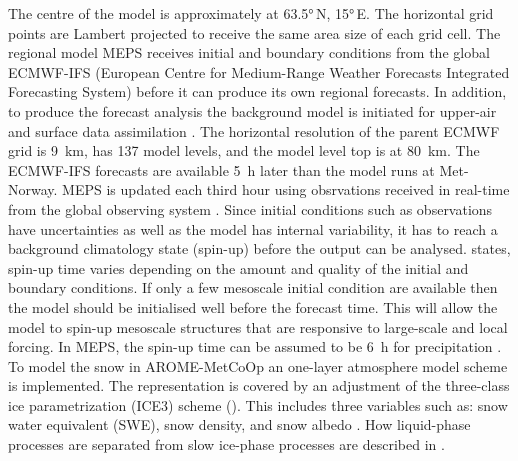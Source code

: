 The centre of the model is approximately at \ang{63.5}\,N, \ang{15}\,E. 
The horizontal grid points are %
Lambert projected to receive the same area size of each grid cell. 
The regional model MEPS receives initial and boundary conditions from the global ECMWF-IFS (European Centre for Medium-Range Weather Forecasts Integrated Forecasting System) before it can produce its own regional forecasts. In addition, to produce the forecast analysis the background model is initiated for upper-air and surface data assimilation \citep{muller_arome-metcoop:_2017}. 
The horizontal resolution of the parent ECMWF grid is \SI{9}{\km}, has \num{137} model levels, and the model level top is at \SI{80}{\km}. The ECMWF-IFS forecasts are available \SI{5}{\hour} later than the model runs at Met-Norway. MEPS is updated each third hour using obsrvations received in real-time from the global observing system \citep{homleid_verification_2016}.
Since initial conditions such as observations have uncertainties as well as the model has internal variability, it has to reach a background climatology state (spin-up) before the output can be analysed. %
\citet{warner_tutorial_1997} states, spin-up time varies depending on the amount and quality of the initial and boundary conditions. If only a few mesoscale initial condition are available then the model should be initialised well before the forecast time. This will allow the model to spin-up mesoscale structures that are responsive to large-scale and local forcing. 
In MEPS, the spin-up time %
can be assumed to be \SI{6}{\hour} for precipitation \citep[personal communication,][]{Priv_Comm_Koltzow}. 
\\
To model the snow in AROME-MetCoOp an one-layer atmosphere model scheme is implemented. The representation is covered by an adjustment of the three-class ice parametrization (ICE3) scheme (). 
This includes three variables such as: snow water equivalent (SWE), snow density, and snow albedo \citep{muller_arome-metcoop:_2017}.
How liquid-phase processes are separated from slow ice-phase processes are described in . 

